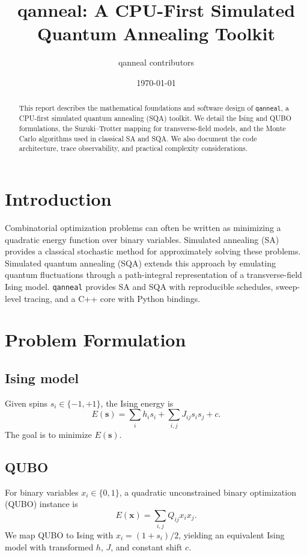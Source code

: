\documentclass[11pt]{article}
\title{qanneal: A CPU-First Simulated Quantum Annealing Toolkit}
\author{qanneal contributors}
\date{\today}
\begin{document}
\maketitle

\begin{abstract}
This report describes the mathematical foundations and software design of \texttt{qanneal}, a CPU-first simulated quantum annealing (SQA) toolkit. We detail the Ising and QUBO formulations, the Suzuki--Trotter mapping for transverse-field models, and the Monte Carlo algorithms used in classical SA and SQA. We also document the code architecture, trace observability, and practical complexity considerations.
\end{abstract}

\section{Introduction}
Combinatorial optimization problems can often be written as minimizing a quadratic energy function over binary variables. Simulated annealing (SA) provides a classical stochastic method for approximately solving these problems. Simulated quantum annealing (SQA) extends this approach by emulating quantum fluctuations through a path-integral representation of a transverse-field Ising model. \texttt{qanneal} provides SA and SQA with reproducible schedules, sweep-level tracing, and a C++ core with Python bindings.

\section{Problem Formulation}

\subsection{Ising model}
Given spins $s_i \in \{-1, +1\}$, the Ising energy is
\begin{equation}
E(\mathbf{s}) = \sum_i h_i s_i + \sum_{i,j} J_{ij} s_i s_j + c.
\end{equation}
The goal is to minimize $E(\mathbf{s})$.

\subsection{QUBO}
For binary variables $x_i \in \{0,1\}$, a quadratic unconstrained binary optimization (QUBO) instance is
\begin{equation}
E(\mathbf{x}) = \sum_{i,j} Q_{ij} x_i x_j.
\end{equation}
We map QUBO to Ising with $x_i = (1 + s_i)/2$, yielding an equivalent Ising model with transformed $h$, $J$, and constant shift $c$.
\end{document}
